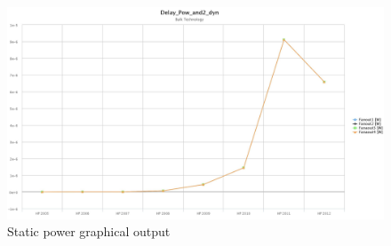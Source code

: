 \documentclass[12pt,  english, makeidx, a4paper, titlepage, oneside]{article}
\begin{document}
\begin{figure}[htbp]
	\begin{center}
		\includegraphics[width=17cm]{img/Delay_Pow_and2_dyn_Spower.jpeg}
		\caption{Static power graphical output}
		\label{fig:spower_out}
	\end{center}
\end{figure}
\end{document}
